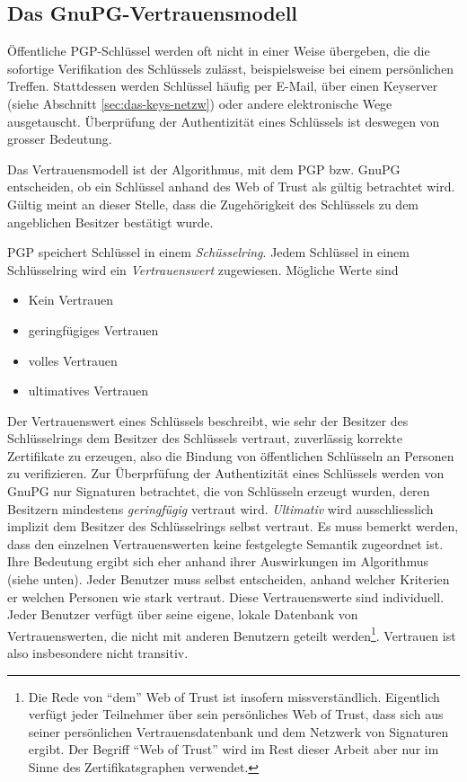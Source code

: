 \subsection{Das GnuPG-Vertrauensmodell}
\label{sec:das-gnupg-vertrauensmodell}

Öffentliche PGP-Schlüssel werden oft nicht in einer Weise übergeben,
die die sofortige Verifikation des Schlüssels zulässt, beispielsweise
bei einem persönlichen Treffen. Stattdessen werden Schlüssel häufig
per E-Mail, über einen Keyserver (siehe Abschnitt
\ref{sec:das-keys-netzw}) oder andere elektronische Wege ausgetauscht.
Überprüfung der Authentizität eines Schlüssels ist deswegen von
grosser Bedeutung.

Das Vertrauensmodell ist der Algorithmus, mit dem PGP bzw. GnuPG
entscheiden, ob ein Schl\"ussel anhand des Web of Trust als g\"ultig
betrachtet wird\cite{Ashley1999}. G\"ultig meint an dieser Stelle,
dass die Zugeh\"origkeit des Schl\"ussels zu dem angeblichen Besitzer
best\"atigt wurde.

PGP speichert Schl\"ussel in einem \emph{Sch\"usselring}. Jedem
Schl\"ussel in einem Schl\"usselring wird ein \emph{Vertrauenswert}
zugewiesen. M\"ogliche Werte sind
\begin{itemize}
\item Kein Vertrauen
\item geringf\"ugiges Vertrauen
\item volles Vertrauen
\item ultimatives Vertrauen
\end{itemize}
Der Vertrauenswert eines Schl\"ussels beschreibt, wie sehr der
Besitzer des Schl\"usselrings dem Besitzer des Schl\"ussels vertraut,
zuverl\"assig korrekte Zertifikate zu erzeugen, also die Bindung von
\"offentlichen Schl\"usseln an Personen zu verifizieren.  Zur
\"Uberprf\"ufung der Authentizit\"at eines Schl\"ussels werden von
GnuPG nur Signaturen betrachtet, die von Schl\"usseln erzeugt wurden,
deren Besitzern mindestens \emph{geringf\"ugig} vertraut
wird. \emph{Ultimativ} wird ausschliesslich implizit dem Besitzer des
Schl\"usselrings selbst vertraut. Es muss bemerkt werden, dass den
einzelnen Vertrauenswerten keine festgelegte Semantik zugeordnet
ist. Ihre Bedeutung ergibt sich eher anhand ihrer Auswirkungen im
Algorithmus (siehe unten). Jeder Benutzer muss selbst entscheiden,
anhand welcher Kriterien er welchen Personen wie stark vertraut. Diese
Vertrauenswerte sind individuell. Jeder Benutzer verf\"ugt \"uber
seine eigene, lokale Datenbank von Vertrauenswerten, die nicht mit
anderen Benutzern geteilt werden\footnote{Die Rede von ``dem'' Web of
  Trust ist insofern missverst\"andlich. Eigentlich verf\"ugt jeder
  Teilnehmer \"uber sein pers\"onliches Web of Trust, dass sich aus
  seiner pers\"onlichen Vertrauensdatenbank und dem Netzwerk von
  Signaturen ergibt. Der Begriff ``Web of Trust'' wird im Rest dieser
  Arbeit aber nur im Sinne des Zertifikatsgraphen
  verwendet.}. Vertrauen ist also insbesondere nicht transitiv.

